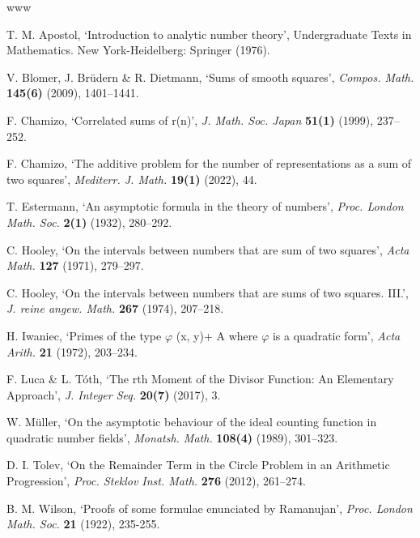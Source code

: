 \documentclass[12pt]{amsart}
\newcommand{\1}{\mathmybb{1}}
\begin{document}
\begin{thebibliography}{www}

 T. M. Apostol, `Introduction to analytic number theory', Undergraduate Texts in Mathematics. New York-Heidelberg: Springer (1976).

 V. Blomer, J. Br{\"u}dern \& R. Dietmann, `Sums of smooth squares', {\it 	Compos. Math.} {\bf 145(6)} (2009), 1401--1441.

 F. Chamizo, `Correlated sums of r(n)', {\it J. Math. Soc. Japan} {\bf 51(1)} (1999), 237--252.

 F. Chamizo, `The additive problem for the number of representations as a sum of two squares', {\it Mediterr. J. Math.} {\bf 19(1)} (2022), 44.

 T. Estermann, `An asymptotic formula in the theory of numbers', {\it Proc. London Math. Soc.} {\bf 2(1)} (1932), 280--292.

 C. Hooley, `On the intervals between numbers that are sum of two squares', {\it Acta Math.} {\bf 127} (1971), 279--297.

 C. Hooley, `On the intervals between numbers that are sums of two squares. III.', {\it J. reine angew. Math.} {\bf 267} (1974), 207--218.

 H. Iwaniec, `Primes of the type $\varphi$ (x, y)+ A where $\varphi$ is a quadratic form', {\it Acta Arith.} {\bf 21} (1972), 203--234.

 F. Luca \& L. T{\'o}th, `The rth Moment of the Divisor Function: An Elementary Approach', {\it J. Integer Seq.} {\bf 20(7)} (2017), 3.

 W. M{\"u}ller, `On the asymptotic behaviour of the ideal counting function in quadratic number fields', {\it Monatsh. Math.} {\bf 108(4)} (1989), 301--323.

 D. I. Tolev, `On the Remainder Term in the Circle Problem in an Arithmetic Progression', {\it Proc. Steklov Inst. Math.} {\bf 276} (2012), 261--274.

 B. M. Wilson, `Proofs of some formulae enunciated by Ramanujan', {\it Proc. London Math. Soc.} {\bf 21} (1922), 235-255.


\end{thebibliography} 
\end{document}
